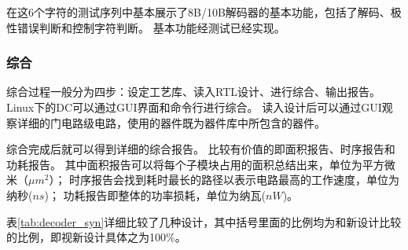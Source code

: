 \documentclass[UTF8]{ctexart}
\begin{document}
在这6个字符的测试序列中基本展示了8B/10B解码器的基本功能，包括了解码、极性错误判断和控制字符判断。
基本功能经测试已经实现。

\subsubsection{综合}

综合过程一般分为四步：设定工艺库、读入RTL设计、进行综合、输出报告。
Linux下的DC可以通过GUI界面和命令行进行综合。
读入设计后可以通过GUI观察详细的门电路级电路，使用的器件既为器件库中所包含的器件。

综合完成后就可以得到详细的综合报告。
比较有价值的即面积报告、时序报告和功耗报告。
其中面积报告可以将每个子模块占用的面积总结出来，单位为平方微米（$\mu m^2$）；
时序报告会找到耗时最长的路径以表示电路最高的工作速度，单位为纳秒($ns$)；
功耗报告即整体的功率损耗，单位为纳瓦($nW$)。

表\ref{tab:decoder_syn}详细比较了几种设计，其中括号里面的比例均为和新设计比较的比例，即视新设计具体之为100\%。
\end{document}
